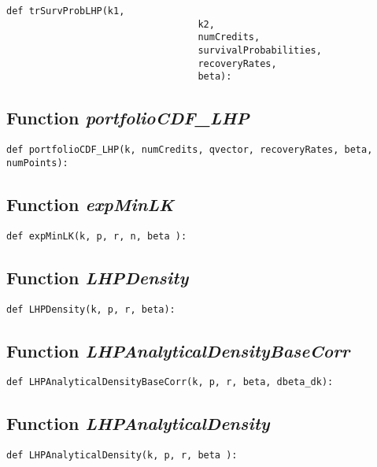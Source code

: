 \documentclass[twoside,11pt]{book}
\begin{document}
\begin{lstlisting}
def trSurvProbLHP(k1, 
                                  k2, 
                                  numCredits, 
                                  survivalProbabilities, 
                                  recoveryRates, 
                                  beta):
\end{lstlisting}

\subsection{Function {\it portfolioCDF\_LHP}}


\begin{lstlisting}
def portfolioCDF_LHP(k, numCredits, qvector, recoveryRates, beta, numPoints):
\end{lstlisting}

\subsection{Function {\it expMinLK}}


\begin{lstlisting}
def expMinLK(k, p, r, n, beta ):
\end{lstlisting}

\subsection{Function {\it LHPDensity}}


\begin{lstlisting}
def LHPDensity(k, p, r, beta):
\end{lstlisting}

\subsection{Function {\it LHPAnalyticalDensityBaseCorr}}


\begin{lstlisting}
def LHPAnalyticalDensityBaseCorr(k, p, r, beta, dbeta_dk):
\end{lstlisting}

\subsection{Function {\it LHPAnalyticalDensity}}


\begin{lstlisting}
def LHPAnalyticalDensity(k, p, r, beta ):
\end{lstlisting}
\end{document}
